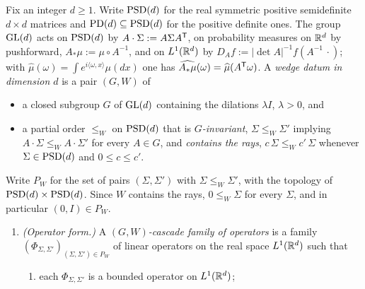 \begin{definition}
\label{def:gw-cascade-family}
\leanok
Fix an integer $d \ge 1$. Write $\mathrm{PSD}(d)$ for the real symmetric positive semidefinite
$d \times d$ matrices and $\mathrm{PD}(d) \subseteq \mathrm{PSD}(d)$ for the positive definite ones. The group
$\mathrm{GL}(d)$ acts on $\mathrm{PSD}(d)$ by $A \cdot \Sigma := A\Sigma A^{\mathsf{T}}$, on probability measures on
$\mathbb{R}^d$ by pushforward, $A_*\mu := \mu \circ A^{-1}$, and on $L^1(\mathbb{R}^d)$ by
$D_Af := |\det A|^{-1}f(A^{-1}\,\cdot)$; with
$\widehat\mu(\omega) = \int e^{i\langle\omega,x\rangle}\mu(dx)$ one has
$\widehat{A_*\mu}(\omega) = \widehat\mu(A^{\mathsf{T}}\omega)$. A \emph{wedge datum in dimension $d$} is a
pair $(G, W)$ of
\begin{itemize}
\item a closed subgroup $G$ of $\mathrm{GL}(d)$ containing the dilations $\lambda I$, $\lambda > 0$, and
\item a partial order $\le_W$ on $\mathrm{PSD}(d)$ that is \emph{$G$-invariant}, $\Sigma \le_W \Sigma'$
implying $A \cdot \Sigma \le_W A \cdot \Sigma'$ for every $A \in G$, and \emph{contains the rays},
$c\,\Sigma \le_W c'\,\Sigma$ whenever $\Sigma \in \mathrm{PSD}(d)$ and $0 \le c \le c'$.
\end{itemize}
Write $P_W$ for the set of pairs $(\Sigma, \Sigma')$ with $\Sigma \le_W \Sigma'$, with the topology
of $\mathrm{PSD}(d) \times \mathrm{PSD}(d)$. Since $W$ contains the rays, $0 \le_W \Sigma$ for every $\Sigma$, and
in particular $(0, I) \in P_W$.
\begin{enumerate}
\item \emph{(Operator form.)} A \emph{$(G, W)$-cascade family of operators} is a family
$(\Phi_{\Sigma,\Sigma'})_{(\Sigma,\Sigma') \in P_W}$ of linear operators on the real space
$L^1(\mathbb{R}^d)$ such that
\begin{enumerate}
\item[(A1)] each $\Phi_{\Sigma,\Sigma'}$ is a bounded operator on $L^1(\mathbb{R}^d)$;

\end{enumerate}
\end{enumerate}
\end{definition}

